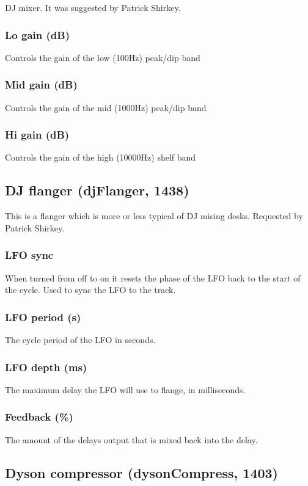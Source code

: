\documentclass[11pt]{article}
\begin{document}
DJ mixer. It was suggested by Patrick Shirkey.\subsubsection*{Lo gain (dB)}
Controls the gain of the low (100Hz) peak/dip band\subsubsection*{Mid gain (dB)}
Controls the gain of the mid (1000Hz) peak/dip band\subsubsection*{Hi gain (dB)}
Controls the gain of the high (10000Hz) shelf band\subsection{DJ flanger (djFlanger, 1438)\label{djFlanger}\label{id1438}}
This is a flanger which is more or less typical of DJ mising desks. Requested by Patrick Shirkey.\subsubsection*{LFO sync}
When turned from off to on it resets the phase of the LFO back to the start of the cycle. Used to sync the LFO to the track.\subsubsection*{LFO period (s)}
The cycle period of the LFO in seconds.\subsubsection*{LFO depth (ms)}
The maximum delay the LFO will use to flange, in milliseconds.\subsubsection*{Feedback (\%)}
The amount of the delays output that is mixed back into the delay.\subsection{Dyson compressor (dysonCompress, 1403)\label{dysonCompress}\label{id1403}}
\end{document}
